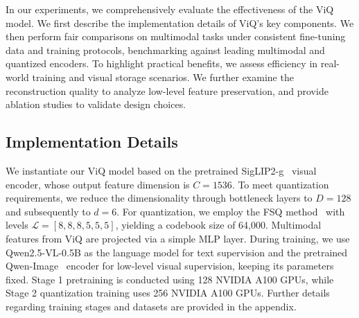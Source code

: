 \documentclass{llmxive}
\begin{document}
In our experiments, we comprehensively evaluate the effectiveness of the ViQ model. We first describe the implementation details of ViQ's key components. We then perform fair comparisons on multimodal tasks under consistent fine-tuning data and training protocols, benchmarking against leading multimodal and quantized encoders. To highlight practical benefits, we assess efficiency in real-world training and visual storage scenarios. We further examine the reconstruction quality to analyze low-level feature preservation, and provide ablation studies to validate design choices.

\subsection{Implementation Details}

We instantiate our ViQ model based on the pretrained SigLIP2-g~\cite{tschannen2025siglip} visual encoder, whose output feature dimension is $C=1536$. To meet quantization requirements, we reduce the dimensionality through bottleneck layers to $D=128$ and subsequently to $d=6$. For quantization, we employ the FSQ method~\cite{mentzerfinite} with levels $\mathcal{L}=[8,8,8,5,5,5]$, yielding a codebook size of 64,000. Multimodal features from ViQ are projected via a simple MLP layer. During training, we use Qwen2.5-VL-0.5B as the language model for text supervision and the pretrained Qwen-Image~\cite{wu2025qwenimage} encoder for low-level visual supervision, keeping its parameters fixed. Stage 1 pretraining is conducted using 128 NVIDIA A100 GPUs, while Stage 2 quantization training uses 256 NVIDIA A100 GPUs. Further details regarding training stages and datasets are provided in the appendix.
\end{document}
